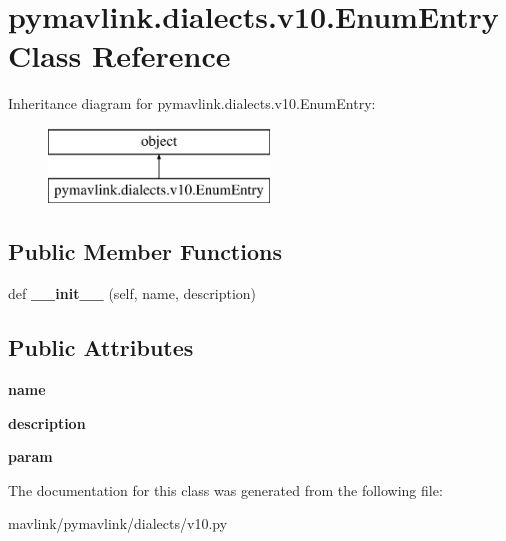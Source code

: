 \hypertarget{classpymavlink_1_1dialects_1_1v10_1_1EnumEntry}{}\section{pymavlink.\+dialects.\+v10.\+Enum\+Entry Class Reference}
\label{classpymavlink_1_1dialects_1_1v10_1_1EnumEntry}
Inheritance diagram for pymavlink.\+dialects.\+v10.\+Enum\+Entry\+:\begin{figure}[H]
\begin{center}
\leavevmode
\includegraphics[height=2.000000cm]{classpymavlink_1_1dialects_1_1v10_1_1EnumEntry}
\end{center}
\end{figure}
\subsection*{Public Member Functions}
\begin{DoxyCompactItemize}
\item 
\mbox{\label{classpymavlink_1_1dialects_1_1v10_1_1EnumEntry_a10733ab97d7c51c763ab7495d04f121d}} 
def {\bfseries \+\_\+\+\_\+init\+\_\+\+\_\+} (self, name, description)
\end{DoxyCompactItemize}
\subsection*{Public Attributes}
\begin{DoxyCompactItemize}
\item 
\mbox{\label{classpymavlink_1_1dialects_1_1v10_1_1EnumEntry_a387c1fde05bea6b478f2db4e8dc4f9a6}} 
{\bfseries name}
\item 
\mbox{\label{classpymavlink_1_1dialects_1_1v10_1_1EnumEntry_a028f6be54e29447bbd70e6de536b2941}} 
{\bfseries description}
\item 
\mbox{\label{classpymavlink_1_1dialects_1_1v10_1_1EnumEntry_ac44e50a668ebec60a869db0cf3895412}} 
{\bfseries param}
\end{DoxyCompactItemize}


The documentation for this class was generated from the following file\+:\begin{DoxyCompactItemize}
\item 
mavlink/pymavlink/dialects/v10.\+py\end{DoxyCompactItemize}
